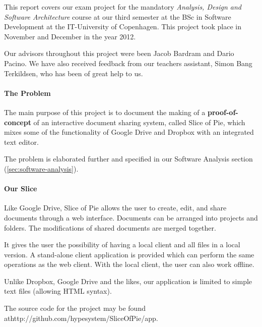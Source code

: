This report covers our exam project for the mandatory \emph{Analysis, Design and Software Architecture}
course at our third semester at the BSc in Software Development at the IT-University of Copenhagen.
This project took place in November and December in the year 2012. 

Our advisors throughout this project were been Jacob Bardram and Dario Pacino. We have also received feedback from
our teachers assistant, Simon Bang Terkildsen, who has been of great help to us.

\paragraph{The Problem}
The main purpose of this project is to document the making of a \textbf{proof-of-concept} of an interactive document
sharing system, called Slice of Pie, which mixes some of the functionality of Google Drive and Dropbox with
an integrated text editor.

The problem is elaborated further and specified in our Software Analysis section (\ref{sec:software-analysis}).

\paragraph{Our Slice}
Like Google Drive, Slice of Pie allows the user to create, edit, and share documents through a web interface.
Documents can be arranged into projects and folders. The modifications of shared documents are merged together.

It gives the user the possibility of having a local client and all files in a local version. A stand-alone client
application is provided which can perform the same operations as the web client. With the local client, the user
can also work offline.

Unlike Dropbox, Google Drive and the likes, our application is limited to simple text files (allowing HTML syntax).

The source code for the project may be found at\newline http://github.com/hypesystem/SliceOfPie/app.